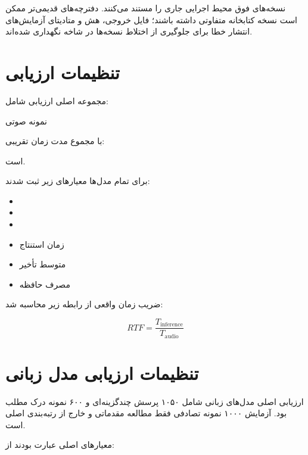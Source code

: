 نسخه‌های فوق محیط اجرایی جاری را مستند می‌کنند. دفترچه‌های
قدیمی‌تر ممکن است نسخه کتابخانه متفاوتی داشته باشند؛ فایل خروجی،
هش و متادیتای آزمایش‌های انتشار خطا برای جلوگیری از اختلاط
نسخه‌ها در شاخه  نگهداری شده‌اند.


\section{تنظیمات ارزیابی }

مجموعه اصلی ارزیابی  شامل:

\begin{center}
نمونه صوتی
\end{center}

با مجموع مدت زمان تقریبی:

\begin{center}
\end{center}

است.

برای تمام مدل‌ها معیارهای زیر ثبت شدند:

\begin{itemize}
    \item {}
    \item {}
    \item {}
    \item زمان استنتاج
    \item متوسط تأخیر
    \item مصرف حافظه 
\end{itemize}

ضریب زمان واقعی از رابطه زیر محاسبه شد:

\begin{equation}
RTF =
\frac{T_{\mathrm{inference}}}
     {T_{\mathrm{audio}}}
\end{equation}


\section{تنظیمات ارزیابی مدل زبانی}

ارزیابی اصلی مدل‌های زبانی شامل ۱۰۵۰ پرسش چندگزینه‌ای
 و ۶۰۰ نمونه درک مطلب  بود.
آزمایش ۱۰۰۰ نمونه تصادفی  فقط مطالعه مقدماتی
و خارج از رتبه‌بندی اصلی است.

معیارهای اصلی عبارت بودند از:

